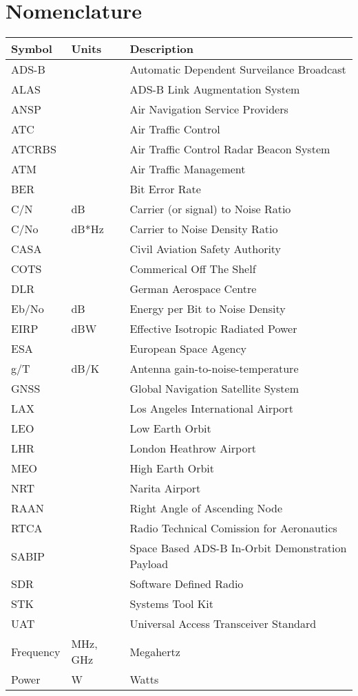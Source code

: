 \chapter*{Nomenclature}
\renewcommand*{\arraystretch}{1.0}
\begin{longtable}[l]{p{50pt} p{60pt} p{300pt}}
\textbf{Symbol}	& \textbf{Units} & \textbf{Description} \\ \endhead
    ADS-B &       & Automatic Dependent Surveilance Broadcast \\
    ALAS  &       & ADS-B Link Augmentation System \\
    ANSP  &       & Air Navigation Service Providers \\
    ATC   &       & Air Traffic Control \\
    ATCRBS &       & Air Traffic Control Radar Beacon 
System \\
    ATM   &       & Air Traffic Management \\
    BER   &       & Bit Error Rate \\
    C/N   & dB    & Carrier (or signal) to Noise Ratio \\
    C/No  & dB*Hz & Carrier to Noise Density Ratio \\
    CASA  &       & Civil Aviation Safety Authority \\
    COTS  &       & Commerical Off The Shelf \\
    DLR   &       & German Aerospace Centre \\
    Eb/No & dB    & Energy per Bit to Noise Density \\
    EIRP  & dBW   & Effective Isotropic Radiated Power \\
    ESA   &       & European Space Agency \\
    g/T   & dB/K  & Antenna gain-to-noise-temperature \\
    GNSS  &       & Global Navigation Satellite System \\
    LAX   &       & Los Angeles International Airport \\
    LEO   &       & Low Earth Orbit \\
    LHR   &       & London Heathrow Airport \\
    MEO   &       & High Earth Orbit \\
    NRT   &       & Narita Airport \\
    RAAN  &       & Right Angle of Ascending Node \\
    RTCA  &       & Radio Technical Comission for Aeronautics \\
    SABIP &       & Space Based ADS-B In-Orbit Demonstration Payload \\
    SDR   &       & Software Defined Radio \\
    STK   &       & Systems Tool Kit \\
    UAT   &       & Universal Access Transceiver Standard \\
    Frequency & MHz, GHz & Megahertz \\
    Power & W     & Watts \\
 
\end{longtable}
\renewcommand*{\arraystretch}{1.4}

